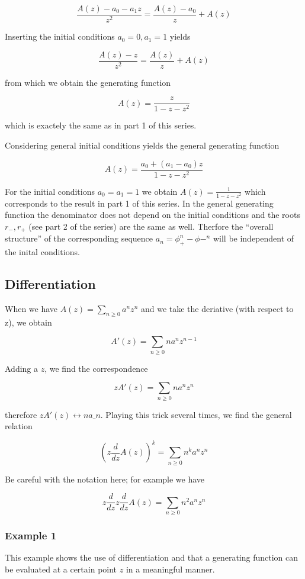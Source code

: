 \[ \frac{A(z) - a_0 - a_1 z}{z^2} = \frac{A(z)-a_0}{z} + A(z)\]

Inserting the initial conditions $a_0=0, a_1=1$ yields

\[ \frac{A(z) - z}{z^2} = \frac{A(z)}{z} + A(z)\]

from which we obtain the generating function

\[ A(z) = \frac{z}{1-z-z^2} \]

which is exactely the same as in part 1 of this series.

Considering general initial conditions yields the general generating function

\[ A(z) = \frac{a_0 + (a_1 -a_0) z}{1-z-z^2} \]

For the initial conditions $a_0=a_1=1$ we obtain $A(z) = \frac{1}{1-z-z^2}$ which corresponds to the result in part 1 of this series. In the general generating function the denominator does not depend on the initial conditions and the roots $r_-, r_+$ (see part 2 of the series) are the same as well. Therfore the ``overall structure'' of the corresponding sequence $a_n=\phi_+^n - \phi-^n$ will be independent of the inital conditions.

\subsection{Differentiation}\label{differentiation}

When we have $A(z) = \sum_{n \geq 0} a^n z^n$ and we take the deriative (with respect to z), we obtain

\[A'(z) = \sum_{n \geq 0} n a^n z^{n-1}\]

Adding a $z$, we find the correspondence

\[z A'(z) = \sum_{n \geq 0} n a^n z^n\]

therefore $z A'(z) \leftrightarrow n a\_n$. Playing this trick several times, we find the general relation

\[\left( z \frac{d}{dz} A(z) \right)^k = \sum_{n \geq 0} n^k a^n z^n\]

Be careful with the notation here; for example we have

\[ z \frac{d}{dz} z \frac{d}{dz} A(z) = \sum_{n \geq 0} n^2 a^n z^n \]

\subsubsection{Example 1}\label{example-1}

This example shows the use of differentiation and that a generating function can be evaluated at a certain point $z$ in a meaningful manner.

